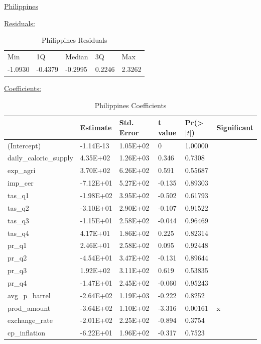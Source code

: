 \documentclass[11pt]{article}
\begin{document}
\newpage
\begin{center}\underline{Philippines} \end{center}
\underline{Residuals:}
\FloatBarrier
\begin{table}[!htbp]
\centering
\begin{tabular}{lllll}
Min     & 1Q      & Median  & 3Q     & Max    \\
-1.0930 & -0.4379 & -0.2995 & 0.2246 & 2.3262
\end{tabular}
\caption{Philippines Residuals}
\label{table17l}
\end{table}
\FloatBarrier

\underline{Coefficients:}
\FloatBarrier
\begin{table}[!htbp]
\centering
\begin{tabular}{llllll}
\hline
                       & Estimate  & Std. Error & t value & Pr(\textgreater$|t|$) & Significant \\ \hline
(Intercept)            & -1.14E-13 & 1.05E+02   & 0       & 1.00000             &             \\
daily\_caloric\_supply & 4.35E+02  & 1.26E+03   & 0.346   & 0.7308              &             \\
exp\_agri              & 3.70E+02  & 6.26E+02   & 0.591   & 0.55687             &             \\
imp\_cer               & -7.12E+01 & 5.27E+02   & -0.135  & 0.89303             &             \\
tas\_q1                & -1.98E+02 & 3.95E+02   & -0.502  & 0.61793             &             \\
tas\_q2                & -3.10E+01 & 2.90E+02   & -0.107  & 0.91522             &             \\
tas\_q3                & -1.15E+01 & 2.58E+02   & -0.044  & 0.96469             &             \\
tas\_q4                & 4.17E+01  & 1.86E+02   & 0.225   & 0.82314             &             \\
pr\_q1                 & 2.46E+01  & 2.58E+02   & 0.095   & 0.92448             &             \\
pr\_q2                 & -4.54E+01 & 3.47E+02   & -0.131  & 0.89644             &             \\
pr\_q3                 & 1.92E+02  & 3.11E+02   & 0.619   & 0.53835             &             \\
pr\_q4                 & -1.47E+01 & 2.45E+02   & -0.060  & 0.95243             &             \\
avg\_p\_barrel         & -2.64E+02 & 1.19E+03   & -0.222  & 0.8252              &             \\
prod\_amount           & -3.64E+02 & 1.10E+02   & -3.316  & 0.00161             & x           \\
exchange\_rate         & -2.01E+02 & 2.25E+02   & -0.894  & 0.3754              &             \\
cp\_inflation          & -6.22E+01 & 1.96E+02   & -0.317  & 0.7523              &            \\ \hline
\end{tabular}
\caption{Philippines Coefficients}
\label{table18}
\end{table}
\end{document}
